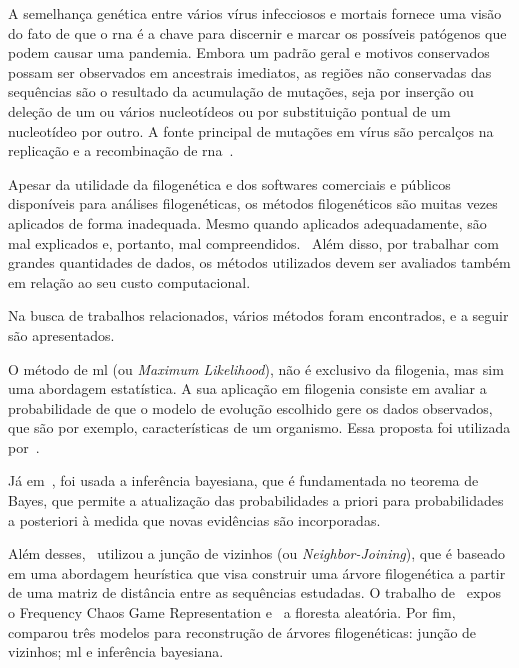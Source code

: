 A semelhança genética entre vários vírus infecciosos e mortais fornece uma visão do fato de que o \gls{rna} é a chave para discernir e marcar os possíveis patógenos que podem causar uma pandemia. Embora um padrão geral e motivos conservados possam ser observados em ancestrais imediatos, as regiões não conservadas das sequências são o resultado da acumulação de mutações, seja por inserção ou deleção de um ou vários nucleotídeos ou por substituição pontual de um nucleotídeo por outro. A fonte principal de mutações em vírus são percalços na replicação e a recombinação de \gls{rna}~\cite{behl_threat_2022}.

Apesar da utilidade da filogenética e dos softwares comerciais e públicos disponíveis para análises filogenéticas, os métodos filogenéticos são muitas vezes aplicados de forma inadequada. Mesmo quando aplicados adequadamente, são mal explicados e, portanto, mal compreendidos.~\cite[p. 1]{barry_phylogenetic_analysis_2006} Além disso, por trabalhar com grandes quantidades de dados, os métodos utilizados devem ser avaliados também em relação ao seu custo computacional.

Na busca de trabalhos relacionados, vários métodos foram encontrados, e a seguir são apresentados.

O método de \gls{ml} (ou \textit{Maximum Likelihood}), não é exclusivo da filogenia, mas sim uma abordagem estatística. A sua aplicação em filogenia consiste em avaliar a probabilidade de que o modelo de evolução escolhido gere os dados observados, que são por exemplo, características de um organismo. Essa proposta foi utilizada por~\cite{fall_genetic_diversity_2021,behl_threat_2022,shabbir_comprehensive_2020,hudu_hepatitis_2018,sallard_tracing_2021,paez-espino_diversity_evolution_2019,tang_evolutionary_2021,cho_analysis_2022}.

Já em~\cite{yin_systematic_2019, bedoya-pilozo_molecular_epidemiology_2018}, foi usada a inferência bayesiana, que é fundamentada no teorema de Bayes, que permite a atualização das probabilidades a priori para probabilidades a posteriori à medida que novas evidências são incorporadas.

Além desses,~\cite{potdar_phylogenetic_2021} utilizou a junção de vizinhos (ou \textit{Neighbor-Joining}), que é baseado em uma abordagem heurística que visa construir uma árvore filogenética a partir de uma matriz de distância entre as sequências estudadas. O trabalho de~\cite{lichtblau_alignment-free_2019} expos o Frequency Chaos Game Representation e~\cite{kim_ngs_2022} a floresta aleatória. Por fim,~\cite{dimitrov_updated_2019} comparou três modelos para reconstrução de árvores filogenéticas: junção de vizinhos; \gls{ml} e inferência bayesiana.

